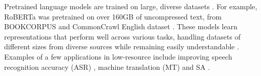 Pretrained language models are trained on large, diverse datasets \cite{raffel2020exploring}. For example, RoBERTa \cite{liu2019roberta} was pretrained on over 160GB of uncompressed text, from BOOKCORPUS \cite{zhu2015aligning} and CommonCrawl English dataset \cite{commoncrawlCommonCrawl}. These models learn representations that perform well across various tasks, handling datasets of different sizes from diverse sources while remaining easily understandable \cite{wang2019superglue}. Examples of a few applications in low-resource include improving speech recognition accuracy (ASR) \cite{olatunji2023afrispeech}, machine translation (MT)  \cite{wang2024afrimte} and SA \cite{muhammad2023afrisenti}.